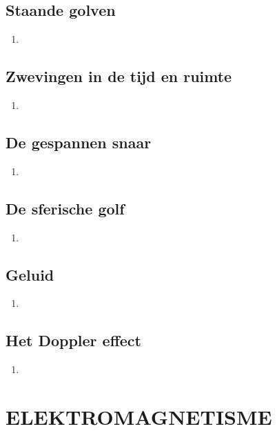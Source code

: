 \documentclass[12pt]{article}
\begin{document}
    \subsection{Staande golven}
    \begin{enumerate}
        \item 
    \end{enumerate}
    \subsection{Zwevingen in de tijd en ruimte}
    \begin{enumerate}
        \item 
    \end{enumerate}
    \subsection{De gespannen snaar}
    \begin{enumerate}
        \item 
    \end{enumerate}
    \subsection{De sferische golf}
    \begin{enumerate}
        \item 
    \end{enumerate}
    \subsection{Geluid}
    \begin{enumerate}
        \item 
    \end{enumerate}
    \subsection{Het Doppler effect}
    \begin{enumerate}
        \item 
    \end{enumerate}



    \section{ELEKTROMAGNETISME}
\end{document}
